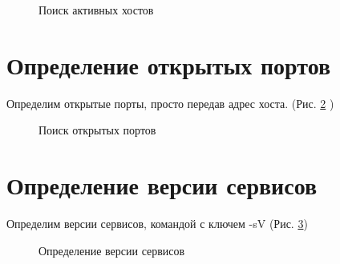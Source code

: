 \documentclass[10pt,a4paper]{report}
\begin{document}
\begin{figure}[ht]	
	\caption{Поиск активных хостов}
	\label{pic:pic3}
\end{figure} 
\section{Определение открытых портов}
Определим открытые порты, просто передав адрес хоста. (Рис. \ref{pic:pic4} )
\begin{figure}[ht]	
	\caption{Поиск открытых портов}
	\label{pic:pic4}
\end{figure} 
\section{Определение версии сервисов}
Определим версии сервисов, командой с ключем -sV (Рис. \ref{pic:pic5})
\begin{figure}[ht]	
	\caption{Определение версии сервисов}
	\label{pic:pic5}
\end{figure} 
\end{document}
